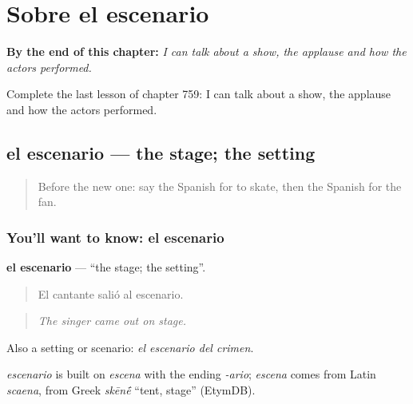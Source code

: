 
\chapter{Sobre el escenario}
\label{ch:es-sobre-el-escenario}

\begin{chapteropening}
\textbf{By the end of this chapter:} \emph{I can talk about a show, the applause and how the actors performed.}

Complete the last lesson of chapter 759: I can talk about a show, the applause and how the actors performed.
\end{chapteropening}

\section[el escenario]{el escenario — the stage; the setting}

\label{lesson:ES-C759-escenario}



\begin{quote}
Before the new one: say the Spanish for to skate, then the Spanish for the fan.
\end{quote}

\subsection*{You'll want to know: el escenario}
\textbf{el escenario} — \textquotedblleft{}the stage; the setting\textquotedblright{}.

\begin{quote}
El cantante salió al escenario.
\end{quote}

\begin{quote}
\emph{The singer came out on stage.}
\end{quote}

Also a setting or scenario: \emph{el escenario del crimen}.

\begin{cousinweb}
\emph{escenario} is built on \emph{escena} with the ending \emph{-ario}; \emph{escena} comes from Latin \emph{scaena}, from Greek \emph{skēn\'{\={e}}} \textquotedblleft{}tent, stage\textquotedblright{} (EtymDB).
\end{cousinweb}


